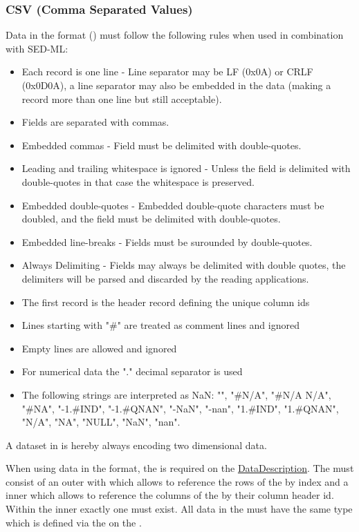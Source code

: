 \subsubsection{CSV (Comma Separated Values)}
\label{sec:dataFormatCSV}
Data in the  format () must follow the following rules when used in combination with SED-ML: 

\begin{itemize}
	\item Each record is one line - Line separator may be LF (0x0A) or CRLF (0x0D0A), a line separator may also be embedded in the data (making a record more than one line but still acceptable).
    \item Fields are separated with commas.
    \item Embedded commas - Field must be delimited with double-quotes.
    \item Leading and trailing whitespace is ignored - Unless the field is delimited with double-quotes in that case the whitespace is preserved.
    \item Embedded double-quotes - Embedded double-quote characters must be doubled, and the field must be delimited with double-quotes.
    \item Embedded line-breaks - Fields must be surounded by double-quotes.
    \item Always Delimiting - Fields may always be delimited with double quotes, the delimiters will be parsed and discarded by the reading applications.
	\item The first record is the header record defining the unique column ids 
	\item Lines starting with "\#" are treated as comment lines and ignored
	\item Empty lines are allowed and ignored
	\item For numerical data the "." decimal separator is used
	\item The following strings are interpreted as NaN: "", "\#N/A", "\#N/A N/A", "\#NA", "-1.\#IND", "-1.\#QNAN", "-NaN", "-nan", "1.\#IND", "1.\#QNAN", "N/A", "NA", "NULL", "NaN", "nan".
\end{itemize}

A dataset in  is hereby always encoding two dimensional data. 

When using data in the  format, the \hyperref[sec:dimensionDescription]{} is required on the \hyperref[class:dataDescription]{DataDescription}. The {} must consist of an outer  with  which allows to reference the rows of the  by index and a inner  which allows to reference the columns of the  by their column header id. Within the inner  exactly one  must exist. All data in the  must have the same type  which is defined via the  on the .

